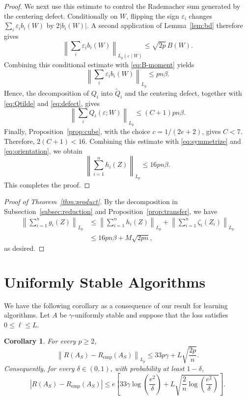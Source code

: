 \documentclass[11pt]{article}
\newtheorem{corollary}{Corollary}
\newcommand{\norm}[1]{\left\lVert #1\right\rVert}
\newcommand{\abs}[1]{\left\lvert #1\right\rvert}
\begin{document}
\begin{proof}
We next use this estimate to control the Rademacher sum generated by the centering defect. Conditionally on $W$, flipping the sign $\varepsilon_i$ changes $\sum_i\varepsilon_i b_i(W)$ by $2\abs{b_i(W)}$. A second application of Lemma~\ref{lem:bd} therefore gives
\[
\norm{\sum_i\varepsilon_i b_i(W)}_{L_p(\varepsilon\mid W)}
\le
\sqrt{2p}\,B(W).
\]
Combining this conditional estimate with \eqref{eq:B-moment} yields
\begin{equation}\label{eq:defect}
\norm{\sum_i\varepsilon_i b_i(W)}_{L_p} \le pn\beta.
\end{equation}
Hence, the decomposition of $Q_i$ into $\widetilde Q_i$ and the centering defect, together with \eqref{eq:Qtilde} and \eqref{eq:defect}, gives
\[
\norm{\sum_iQ_i(\varepsilon;W)}_{L_p} \le (C+1)pn\beta.
\]
Finally, Proposition~\ref{prop:cube}, with the choice
$c=1/(2e+2)$, gives $C<7$. Therefore, $2(C+1) < 16.$ Combining this estimate with \eqref{eq:symmetrize} and
\eqref{eq:orientation}, we obtain
\[
\norm{\sum_{i=1}^n h_i(Z)}_{L_p} \le 16pn\beta.
\]
This completes the proof.
\end{proof}

\begin{proof}[Proof of Theorem~\ref{thm:product}]
By the decomposition in Subsection~\ref{subsec:reduction} and Proposition~\ref{prop:transfer}, we have
\[
\begin{aligned}
\left\|\sum_{i=1}^n g_i(Z)\right\|_{L_p} &\le \left\|\sum_{i=1}^n h_i(Z)\right\|_{L_p} + \left\|\sum_{i=1}^n \zeta_i(Z_i)\right\|_{L_p} \\
&\le 16pn\beta+M\sqrt{2pn},
\end{aligned}
\]
as desired. 
\end{proof}

\section{Uniformly Stable Algorithms}\label{sec:stable}

We have the following corollary as a consequence of our result for learning algorithms. Let $A$ be $\gamma$-uniformly stable and suppose that the loss satisfies $0\le\ell\le L$.

\begin{corollary}\label{cor:stable}
For every $p\ge2$,
\[
\norm{R(A_S)-R_{\mathrm{emp}}(A_S)}_{L_p}
\le
33p\gamma+L\sqrt{\frac{2p}{n}}.
\]
Consequently, for every $\delta\in(0,1)$, with probability at least $1-\delta$,
\begin{equation}\label{eq:stable-tail}
\abs{R(A_S)-R_{\mathrm{emp}}(A_S)}
\le
e\left[
33\gamma\log\left(\frac{e^2}{\delta}\right)
+
L\sqrt{\frac{2}{n}\log\left(\frac{e^2}{\delta}\right)}
\right].
\end{equation}
\end{corollary}
\end{document}
